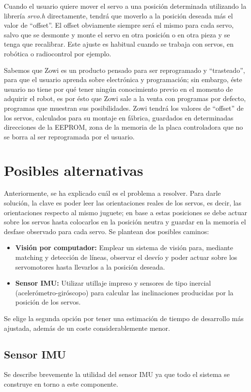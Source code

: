 Cuando el usuario quiere mover el servo a una posición determinada utilizando la librería \textit{srvo.h} directamente, tendrá que moverlo a la posición deseada más el valor de ``offset''. El offset obviamente siempre será el mismo para cada servo, salvo que se desmonte y monte el servo en otra posición o en otra pieza y se tenga que recalibrar. Este ajuste es habitual cuando se trabaja con servos, en robótica o radiocontrol por ejemplo.

Sabemos que Zowi es un producto pensado para ser reprogramado y ``trasteado'', para que el usuario aprenda sobre electrónica y programación; sin embargo, éste usuario no tiene por qué tener ningún conocimiento previo en el momento de adquirir el robot, es por ésto que Zowi sale a la venta con programas por defecto, programas que muestran sus posibilidades. Zowi tendrá los valores de ``offset'' de los servos, calculados para su montaje en fábrica, guardados en determinadas direcciones de la EEPROM, zona de la memoria de la placa controladora que no se borra al ser reprogramada por el usuario.

\section{Posibles alternativas}

Anteriormente, se ha explicado cuál es el problema a resolver. Para darle solución, la clave es poder leer las orientaciones reales de los servos, es decir, las orientaciones respecto al mismo juguete; en base a estas posiciones se debe actuar sobre los servos hasta colocarlos en la posición neutra y guardar en la memoria el desfase observado para cada servo. Se plantean dos posibles caminos:

\begin{itemize}
  \item \textbf{Visión por computador:} Emplear un sistema de visión para, mediante matching y detección de líneas, observar el desvío y poder actuar sobre los servomotores hasta llevarlos a la posición deseada.
  \item \textbf{Sensor IMU:} Utilizar utillaje impreso y sensores de tipo inercial (acelerómetro-giróscopo) para calcular las inclinaciones producidas por la posición de los servos.
\end{itemize}

Se elige la segunda opción por tener una estimación de tiempo de desarrollo más ajustada, además de un coste considerablemente menor.

\subsection{Sensor IMU}
Se describe brevemente la utilidad del sensor IMU ya que todo el sistema se construye en torno a este componente.

